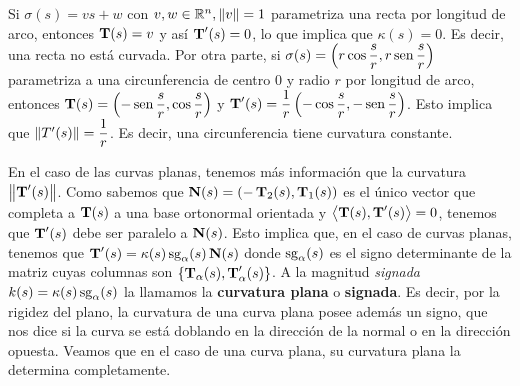 \begin{ex}
Si $\sigma(s)=vs+w$ con $v,w\in\mathbb{R}^n, \left\| v \right\|=1$ parametriza una recta por longitud de arco, entonces $\operatorname{\mathbf{T}}(s)=v$ y así $\operatorname{\mathbf{T}}'(s)=0$, lo que implica que $\kappa(s)=0$. Es decir, una recta no está curvada. Por otra parte, si $\sigma(s)=\left(r\cos\dfrac{s}{r},r\operatorname{sen}\dfrac{s}{r}\right)$ parametriza a una circunferencia de centro $0$ y radio $r$ por longitud de arco, entonces $\operatorname{\mathbf{T}}(s)=\left(-\operatorname{sen}\dfrac{s}{r},\cos\dfrac{s}{r}\right)$ y $\operatorname{\mathbf{T}}'(s)=\dfrac{1}{r}\left(-\cos\dfrac{s}{r},-\operatorname{sen}\dfrac{s}{r}\right)$. Esto implica que $\left\| T'(s) \right\|=\dfrac{1}{r}$. Es decir, una circunferencia tiene curvatura constante.
\end{ex}

En el caso de las curvas planas, tenemos más información que la curvatura $\left\| \operatorname{\mathbf{T}}'(s) \right\|$. Como sabemos que $\operatorname{\mathbf{N}}(s)=(-\operatorname{\mathbf{T}}_2(s),\operatorname{\mathbf{T}}_1(s))$ es el único vector que completa a $\operatorname{\mathbf{T}}(s)$ a una base ortonormal orientada y $\left\langle \operatorname{\mathbf{T}}(s),\operatorname{\mathbf{T}}'(s) \right\rangle=0$, tenemos que $\operatorname{\mathbf{T}}'(s)$ debe ser paralelo a $\operatorname{\mathbf{N}}(s)$. Esto implica que, en el caso de curvas planas, tenemos que $\operatorname{\mathbf{T}}'(s)=\kappa(s)\operatorname{sg}_{\alpha}(s)\operatorname{\mathbf{N}}(s)$ donde $\operatorname{sg}_\alpha(s)$ es el signo determinante de la matriz cuyas columnas son $\{\operatorname{\mathbf{T}}_\alpha(s),\operatorname{\mathbf{T}}'_\alpha(s)\}$. A la magnitud \textit{signada} $k(s) = \kappa(s)\operatorname{sg}_\alpha(s)$ la llamamos la \textbf{curvatura plana} o \textbf{signada}. Es decir, por la rigidez del plano, la curvatura de una curva plana posee además un signo, que nos dice si la curva se está doblando en la dirección de la normal o en la dirección opuesta. Veamos que en el caso de una curva plana, su curvatura plana la determina completamente.

